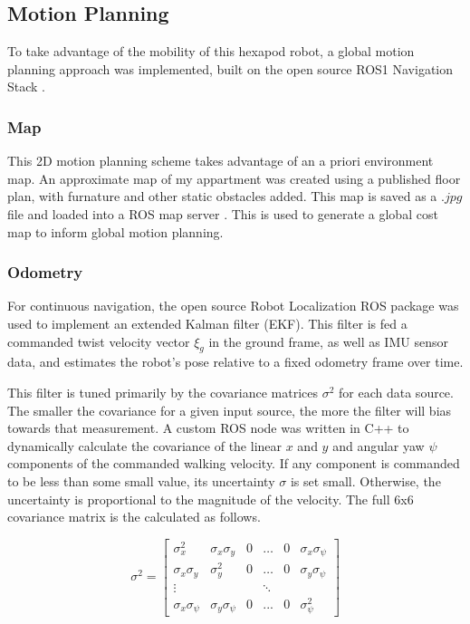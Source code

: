 \subsection{ Motion Planning }

To take advantage of the mobility of this hexapod robot, a global motion planning approach was implemented, built on the open source ROS1 Navigation Stack \cite{navstack}.

\subsubsection{ Map }
This 2D motion planning scheme takes advantage of an a priori environment map. An approximate map of my appartment was created using a published floor plan, with furnature and other static obstacles added. This map is saved as a $.jpg$ file and loaded into a ROS map server \cite{mapserver}. This is used to generate a global cost map to inform global motion planning. 

\subsubsection{ Odometry }
For continuous navigation, the open source Robot Localization ROS package \cite{robotlocalization} was used to implement an extended Kalman filter (EKF). This filter is fed a commanded twist velocity vector $\xi_g$ in the ground frame, as well as IMU sensor data, and estimates the robot's pose relative to a fixed odometry frame over time.

This filter is tuned primarily by the covariance matrices $\sigma^2$ for each data source. The smaller the covariance for a given input source, the more the filter will bias towards that measurement. A custom ROS node was written in C++ to dynamically calculate the covariance of the linear $x$ and $y$ and angular yaw $\psi$ components of the commanded walking velocity. If any component is commanded to be less than some small value, its uncertainty $\sigma$ is set small. Otherwise, the uncertainty is proportional to the magnitude of the velocity. The full 6x6 covariance matrix is the calculated as follows.

\begin{equation}
    \sigma^2 = 
    \begin{bmatrix} 
        \sigma_x^2 & \sigma_x \sigma_y & 0 & \ldots & 0 & \sigma_x \sigma_{\psi} \\
        \sigma_x \sigma_y & \sigma_y^2 & 0 & \ldots & 0 & \sigma_y \sigma_{\psi} \\
        \vdots &  &  & \ddots &  &  \\
        \sigma_x \sigma_{\psi} & \sigma_y \sigma_{\psi} & 0 & ... & 0 & \sigma_{\psi}^2 
    \end{bmatrix}
\end{equation}

